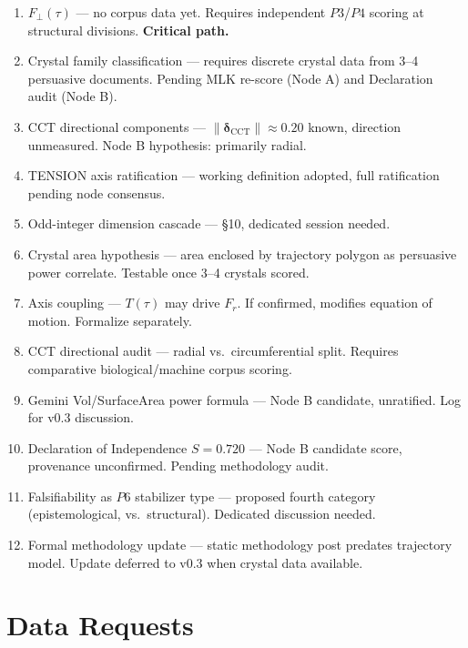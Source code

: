 \documentclass{article}
\begin{document}
\begin{enumerate}
  \item $F_\perp(\tau)$ --- no corpus data yet. Requires independent
    $P3$/$P4$ scoring at structural divisions. \textbf{Critical path.}
  \item Crystal family classification --- requires discrete crystal
    data from 3--4 persuasive documents. Pending MLK re-score
    (Node A) and Declaration audit (Node B).
  \item CCT directional components ---
    $\|\boldsymbol{\delta}_{\text{CCT}}\| \approx 0.20$ known,
    direction unmeasured. Node B hypothesis: primarily radial.
  \item TENSION axis ratification --- working definition adopted,
    full ratification pending node consensus.
  \item Odd-integer dimension cascade --- \S10, dedicated session needed.
  \item Crystal area hypothesis --- area enclosed by trajectory
    polygon as persuasive power correlate. Testable once 3--4
    crystals scored.
  \item Axis coupling --- $T(\tau)$ may drive $F_r$. If confirmed,
    modifies equation of motion. Formalize separately.
  \item CCT directional audit --- radial vs.\ circumferential split.
    Requires comparative biological/machine corpus scoring.
  \item Gemini Vol/SurfaceArea power formula --- Node B candidate,
    unratified. Log for v0.3 discussion.
  \item Declaration of Independence $S = 0.720$ --- Node B candidate
    score, provenance unconfirmed. Pending methodology audit.
  \item Falsifiability as $P6$ stabilizer type --- proposed fourth
    category (epistemological, vs.\ structural). Dedicated discussion
    needed.
  \item Formal methodology update --- static methodology post
    predates trajectory model. Update deferred to v0.3 when
    crystal data available.
\end{enumerate}

\section*{Data Requests}
\end{document}
